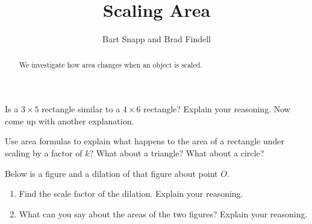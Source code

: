 \documentclass[nooutcomes]{ximera}
\title{Scaling Area}
\author{Bart Snapp and Brad Findell}
\begin{document}
\begin{abstract}
  We investigate how area changes when an object is scaled.
\end{abstract}
\maketitle


\begin{problem}
Is a $3\times 5$ rectangle similar to a $4\times 6$ rectangle?  Explain your reasoning.  Now come up with another explanation. 
\end{problem}

\vspace{.5in} 

\begin{problem}
Use area formulas to explain what happens to the area of a rectangle under scaling by a factor of $k$?  What about a triangle?  What about a circle?  
\end{problem}

\begin{problem}
Below is a figure and a dilation of that figure about point $O$.  
\begin{center}
\end{center}
\begin{enumerate}
\item Find the scale factor of the dilation.  Explain your reasoning. 
\item What can you say about the areas of the two figures?  Explain your reasoning. 
\end{enumerate}
\end{problem}


\end{document}
